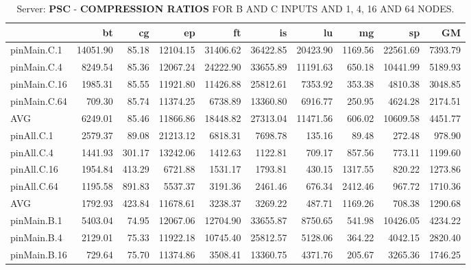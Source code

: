 \begin{table*}[]
\caption{Server: \textbf{PSC} - \textbf{COMPRESSION RATIOS} FOR B AND C INPUTS AND 1, 4, 16 AND 64 NODES.}
\label{cr_pMpA_BC_itn_p3.5}
\begin{center}
\begin{tabular}{|l|rrrrrrrr|r|}
\hline
              &       bt &      cg &       ep &       ft &       is &       lu &      mg &       sp &      GM \\
\hline
 pinMain.C.1  & 14051.90 &   85.18 & 12104.15 & 31406.62 & 36422.85 & 20423.90 & 1169.56 & 22561.69 & 7393.79 \\
 pinMain.C.4  &  8249.54 &   85.36 & 12067.24 & 24222.90 & 33655.89 & 11191.63 &  650.18 & 10441.99 & 5189.93 \\
 pinMain.C.16 &  1985.31 &   85.55 & 11921.80 & 11426.88 & 25812.61 &  7353.92 &  353.38 &  4810.38 & 3048.85 \\
 pinMain.C.64 &   709.30 &   85.74 & 11374.25 &  6738.89 & 13360.80 &  6916.77 &  250.95 &  4624.28 & 2174.51 \\
 \hline
 AVG          &  6249.01 &   85.46 & 11866.86 & 18448.82 & 27313.04 & 11471.56 &  606.02 & 10609.58 & 4451.77 \\
 \hline
 pinAll.C.1   &  2579.37 &   89.08 & 21213.12 &  6818.31 &  7698.78 &   135.16 &   89.48 &   272.48 &  978.90 \\
 pinAll.C.4   &  1441.93 &  301.17 & 13242.06 &  1412.63 &  1122.81 &   709.17 &  857.56 &   773.11 & 1199.60 \\
 pinAll.C.16  &  1954.84 &  413.29 &  6721.88 &  1531.17 &  1793.81 &   430.15 & 1317.55 &   820.22 & 1273.86 \\
 pinAll.C.64  &  1195.58 &  891.83 &  5537.37 &  3191.36 &  2461.46 &   676.34 & 2412.46 &   967.72 & 1710.36 \\
 \hline
 AVG          &  1792.93 &  423.84 & 11678.61 &  3238.37 &  3269.22 &   487.71 & 1169.26 &   708.38 & 1290.68 \\
 \hline
 pinMain.B.1  &  5403.04 &   74.95 & 12067.06 & 12704.90 & 33655.87 &  8750.65 &  541.98 & 10426.05 & 4234.22 \\
 pinMain.B.4  &  2129.01 &   75.33 & 11922.18 & 10745.40 & 25812.57 &  5128.06 &  364.22 &  4042.15 & 2820.40 \\
 pinMain.B.16 &   729.64 &   75.70 & 11374.86 &  3508.41 & 13360.75 &  4371.76 &  205.67 &  3265.36 & 1746.25 \\

\end{tabular}
\end{center}
\end{table*}
